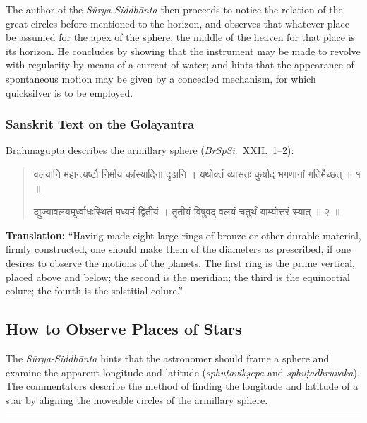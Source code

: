 \documentclass[11pt,a4paper]{article}
\newcommand{\longline}{\noindent\rule{\textwidth}{0.4pt}}
\newcommand{\dev}[1]{{\devanagarifont #1}}
\newenvironment{sanskritverse}{%
  \begin{quote}
  \devanagarifont
  \small
  \color{titlecolor}
}{\end{quote}}
\theoremstyle{definition}
\begin{document}
The author of the \textit{S\=urya-Siddh\=anta} then proceeds to notice the relation of the great circles before mentioned to the horizon, and observes that whatever place be assumed for the apex of the sphere, the middle of the heaven for that place is its horizon. He concludes by showing that the instrument may be made to revolve with regularity by means of a current of water; and hints that the appearance of spontaneous motion may be given by a concealed mechanism, for which quicksilver is to be employed.


\subsubsection{Sanskrit Text on the Golayantra}

Brahmagupta describes the armillary sphere (\textit{BrSpSi}.\ XXII.\ 1--2):

\begin{sanskritverse}
\dev{वलयानि महान्त्यष्टौ निर्माय कांस्यादिना दृढानि ।}
\dev{यथोक्तं व्यासतः कुर्याद् भगणानां गतिमैच्छत् ॥ १ ॥}

\dev{द्युज्यावलयमूर्ध्वाधःस्थितं मध्यमं द्वितीयं ।}
\dev{तृतीयं विषुवद् वलयं चतुर्थं याम्योत्तरं स्यात् ॥ २ ॥}
\end{sanskritverse}

\textbf{Translation:} ``Having made eight large rings of bronze or other durable material, firmly constructed, one should make them of the diameters as prescribed, if one desires to observe the motions of the planets. The first ring is the prime vertical, placed above and below; the second is the meridian; the third is the equinoctial colure; the fourth is the solstitial colure.''

\vspace{0.3cm}

\subsection{How to Observe Places of Stars}

The \textit{S\=urya-Siddh\=anta} hints that the astronomer should frame a sphere and examine the apparent longitude and latitude (\textit{sphu\d{t}avik\d{s}epa} and \textit{sphu\d{t}adhruvaka}). The commentators describe the method of finding the longitude and latitude of a star by aligning the moveable circles of the armillary sphere.

\longline

\newpage
\end{document}

